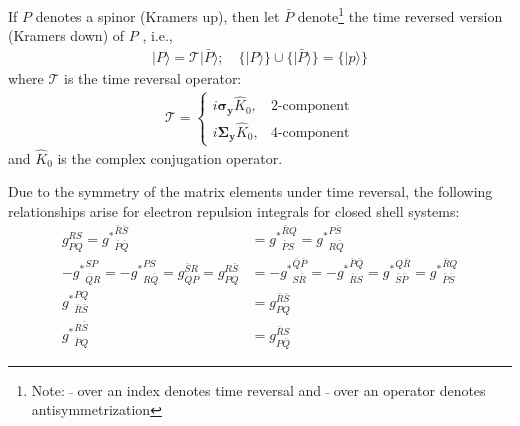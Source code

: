 \documentclass[11pt,oneside]{book}
\begin{document}
If $P$ denotes a spinor (Kramers up), then let $\bar{P}$ denote\footnote{Note: $\bar{}$ over an index denotes time reversal and $\bar{}$ over an operator denotes antisymmetrization} the time reversed version (Kramers down) of $P$ , i.e.,
\begin{align}
   |P \rangle = \mathcal{T}| \bar{P} \rangle; \quad \{  |P \rangle \} \cup \{  |\bar{P} \rangle \} = \{  |p \rangle \}
\end{align}
where $\mathcal{T}$ is the time reversal operator:
\begin{align}
    \mathcal{T} = \begin{cases}
        i\boldsymbol{\sigma_y} \hat{K}_0, &  \text{2-component}\\
        i\boldsymbol{\Sigma_y} \hat{K}_0, &   \text{4-component}  
    \end{cases}
\end{align}
and $\hat{K}_0$ is the complex conjugation operator.



Due to the symmetry of the matrix elements under time reversal, the following relationships arise for electron repulsion integrals for closed shell systems:
\begin{align}
    {g}_{PQ}^{RS} ={g^*}_{\bar{P}\bar{Q}}^{\bar{R}\bar{S}} &= {g^*}_{\bar{P}S}^{\bar{R}Q} = {g^*}_{R\bar{Q}}^{P\bar{S}}\\
    -{g^*}_{ \bar{Q}R }^{ SP } = -{g^*}_{ R \bar{Q} }^{ P S } = {g}_{ Q P }^{ \bar{S}R } = {g}_{ P Q }^{ R\bar{S} } &= -{g^*}_{ S \bar{R} }^{ \bar{Q}\bar{P} } = -{g^*}_{ \bar{R} S }^{ \bar{P} \bar{Q}} = {g^*}_{ \bar{S} \bar{P} }^{ Q \bar{R} } = {g^*}_{ \bar{P} \bar{S}  }^{ \bar{R} Q } \\
    {g^*}_{ \bar{R} \bar{S}  }^{ P Q } &= {g}_{ P Q }^{ \bar{R} \bar{S} } \\
    {g^*}_{ \bar{P} Q  }^{ R \bar{S} } &= {g}_{ P \bar{Q}  }^{ \bar{R} S }
\end{align}
\end{document}

